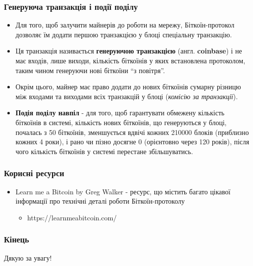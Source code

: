 \documentclass{beamer}
\begin{document}
\begin{frame}
  \frametitle{Генеруюча транзакція і події поділу}
  \begin{itemize}
  \item Для того, щоб залучити майнерів до роботи на мережу, Біткоїн-протокол
    дозволяє їм додати першою транзакцією у блоці спеціальну транзакцію.
  \item Ця транзакція називається \textbf{генеруючою транзакцією}
    (англ. \textbf{coinbase}) і не має входів, лише виходи, кількість біткоїнів
    у яких встановлена протоколом, таким чином генеруючи нові біткоїни ``з
    повітря''.
  \item Окрім цього, майнер має право додати до нових біткоїнів сумарну різницю
    між входами та виходами всіх транзакцій у блоці (\textit{комісію за транзакції}).
  \item \textbf{Подія поділу навпіл} - для того, щоб гарантувати обмежену
    кількість біткоїнів в системі, кількість нових біткоїнів, що генеруються у
    блоці, почалась з 50 біткоїнів, зменшується вдвічі кожних 210000 блоків
    (приблизно кожних 4 роки), і рано чи пізно досягне 0 (орієнтовно через 120
    років), після чого кількість біткоїнів у системі перестане збільшуватись.
  \end{itemize}
\end{frame}

\begin{frame}
  \frametitle{Корисні ресурси}
  \begin{itemize}
  \item Learn me a Bitcoin by Greg Walker - ресурс, що містить багато цікавої
    інформації про технічні деталі роботи Біткоїн-протоколу
    \begin{itemize}
    \item https://learnmeabitcoin.com/
    \end{itemize}
  \end{itemize}
\end{frame}

\begin{frame}
  \frametitle{Кінець}
  \begin{center}
    Дякую за увагу!
  \end{center}
\end{frame}
\end{document}
